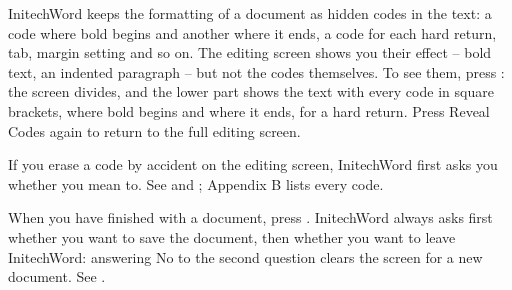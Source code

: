 InitechWord keeps the formatting of a document as hidden codes in the text:
a code where bold begins and another where it ends, a code for each hard
return, tab, margin setting and so on.  The editing screen shows you their
effect -- bold text, an indented paragraph -- but not the codes themselves.
To see them, press : the screen divides, and the
lower part shows the text with every code in square brackets, \Code{[BOLD]}
where bold begins and \Code{[bold]} where it ends, \Code{[HRt]} for a hard
return.  Press Reveal Codes again to return to the full editing screen.

If you erase a code by accident on the editing screen, InitechWord first
asks you whether you mean to.  See  and ;
Appendix B lists every code.

When you have finished with a document, press .  InitechWord
always asks first whether you want to save the document, then whether you
want to leave InitechWord: answering No to the second question clears the
screen for a new document.  See .
